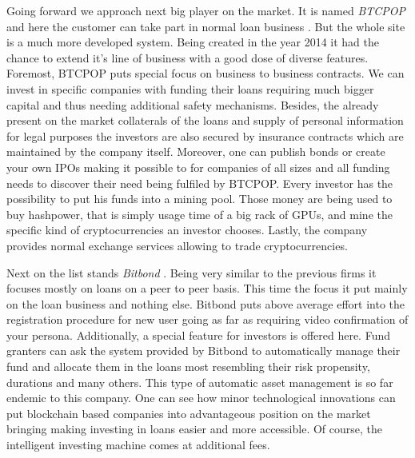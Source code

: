 \documentclass[a4paper,12pt,twoside,openany]{report}
\begin{document}
Going forward we approach next big player on the market. It is named \textit{BTCPOP} and here the customer can take part in normal loan business \cite{btcpop}. But the whole site is a much more developed system. Being created in the year 2014 it had the chance to extend it's line of business with a good dose of diverse features. Foremost, BTCPOP puts special focus on business to business contracts. We can invest in specific companies with funding their loans requiring much bigger capital and thus needing additional safety mechanisms. Besides, the already present on the market collaterals of the loans and supply of personal information for legal purposes the investors are also secured by insurance contracts which are maintained by the company itself. Moreover, one can publish bonds or create your own IPOs making it possible to for companies of all sizes and all funding needs to discover their need being fulfiled by BTCPOP. Every investor has the possibility to put his funds into a mining pool. Those money are being used to buy hashpower, that is simply usage time of a big rack of GPUs, and mine the specific kind of cryptocurrencies an investor chooses. Lastly, the company provides normal exchange services allowing to trade cryptocurrencies. 

Next on the list stands \textit{Bitbond} \cite{bitbond}. Being very similar to the previous firms it focuses mostly on loans on a peer to peer basis. This time the focus it put mainly on the loan business and nothing else. Bitbond puts above average effort into the registration procedure for new user going as far as requiring video confirmation of your persona. Additionally, a special feature for investors is offered here. Fund granters can ask the system provided by Bitbond to automatically manage their fund and allocate them in the loans most resembling their risk propensity, durations and many others. This type of automatic asset management is so far endemic to this company. One can see how minor technological innovations can put blockchain based companies into advantageous position on the market bringing making investing in loans easier and more accessible. Of course, the intelligent investing machine comes at additional fees.
\end{document}
